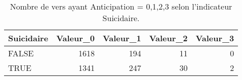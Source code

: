 \begin{table}[H]

\caption{Nombre de vers ayant Anticipation = 0,1,2,3 selon l'indicateur Suicidaire.}
\centering
\begin{tabular}[t]{lrrrr}
\toprule
Suicidaire & Valeur\_0 & Valeur\_1 & Valeur\_2 & Valeur\_3\\
\midrule
FALSE & 1618 & 194 & 11 & 0\\
TRUE & 1341 & 247 & 30 & 2\\
\bottomrule
\end{tabular}
\end{table}